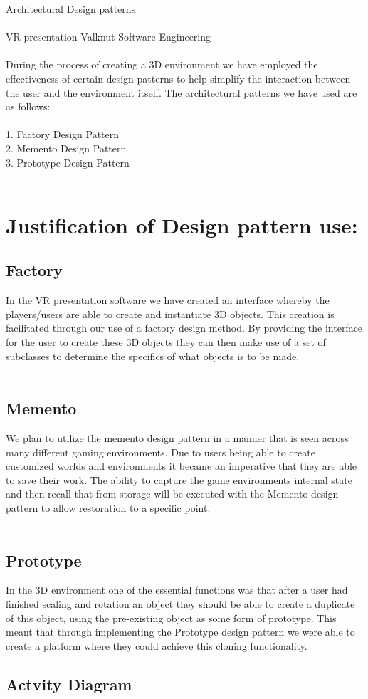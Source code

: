 {\Large Architectural Design patterns} \\\\
 VR presentation Valknut Software Engineering \\\\
During the process of creating a 3D environment we have employed the effectiveness of certain design patterns to help simplify the interaction between the user and the environment itself. The architectural patterns we have used are as follows:\\\\
1.	Factory Design Pattern\\
2.	Memento Design Pattern\\
3.	Prototype Design Pattern\\\\
	\section{Justification of Design pattern use:}
	\subsection{Factory}
	In the VR presentation software we have created an interface whereby the players/users are able to create and instantiate 3D objects. This creation is facilitated through our use of a factory design method. By providing the interface for the user to create these 3D objects they can then make use of a set of subclasses to determine the specifics of what objects is to be made.\\\\
	\subsection{Memento}
	We plan to utilize the memento design pattern in a manner that is seen across many different gaming environments. Due to users being able to create customized worlds and environments it became an imperative that they are able to save their work. The ability to capture the game environments internal state and then recall that from storage will be executed with the Memento design pattern to allow restoration to a specific point.\\\\
	\subsection{Prototype}
	In the 3D environment one of the essential functions was that after a user had finished scaling and rotation an object they should be able to create a duplicate of this object, using the pre-existing object as some form of prototype. This meant that through implementing the Prototype design pattern we were able to create a platform where they could achieve this cloning functionality.
  	\subsection{Actvity Diagram}